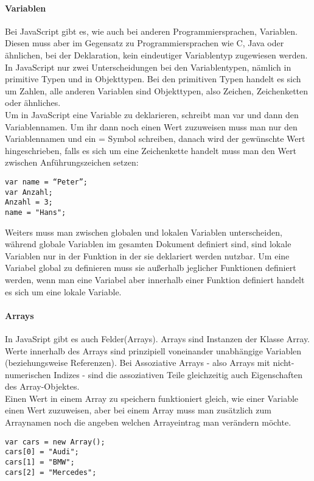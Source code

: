 \paragraph*{Variablen}
Bei JavaScript gibt es, wie auch bei anderen Programmiersprachen, Variablen. Diesen muss aber im Gegensatz zu Programmiersprachen wie C, Java oder ähnlichen, bei der Deklaration, kein eindeutiger Variablentyp zugewiesen werden. In JavaScript nur zwei Unterscheidungen bei den Variablentypen, nämlich in primitive Typen und in Objekttypen.
Bei den primitiven Typen handelt es sich um Zahlen, alle anderen Variablen sind Objekttypen, also Zeichen, Zeichenketten oder ähnliches.\\

Um in JavaScript eine Variable zu deklarieren, schreibt man var und dann den Variablennamen. Um ihr dann noch einen Wert zuzuweisen muss man nur den Variablennamen und ein = Symbol schreiben, danach wird der gewünschte Wert hingeschrieben, falls es sich um eine Zeichenkette handelt muss man den Wert zwischen Anführungszeichen setzen:\\
\begin{lstlisting} 
var name = “Peter”;
var Anzahl;
Anzahl = 3;
name = "Hans";
\end{lstlisting}

Weiters muss man zwischen globalen und lokalen Variablen unterscheiden, während globale Variablen im gesamten Dokument definiert sind, sind lokale Variablen nur in der Funktion in der sie deklariert werden nutzbar. Um eine Variabel global zu definieren muss sie außerhalb jeglicher Funktionen definiert werden, wenn man eine Variabel aber innerhalb einer Funktion definiert handelt es sich um eine lokale Variable.\\

\paragraph*{Arrays}
In JavaSript gibt es auch Felder(Arrays).  Arrays sind Instanzen der Klasse Array. Werte innerhalb des Arrays sind prinzipiell voneinander unabhängige Variablen (beziehungsweise Referenzen). Bei Assoziative Arrays - also Arrays mit nicht-numerischen Indizes - sind die assoziativen Teile gleichzeitig auch Eigenschaften des Array-Objektes.\\
Einen Wert in einem Array zu speichern funktioniert gleich, wie einer Variable einen Wert zuzuweisen, aber bei einem Array muss man zusätzlich zum Arraynamen noch die angeben welchen Arrayeintrag man verändern möchte.\\
\begin{lstlisting}
var cars = new Array();
cars[0] = "Audi";
cars[1] = "BMW";
cars[2] = "Mercedes";
\end{lstlisting}

